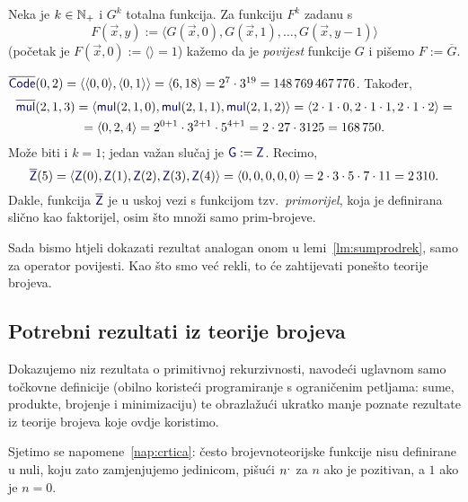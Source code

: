 \begin{definicija}[{name=[povijest totalne brojevne funkcije]}]
Neka je $k\in{\mathbb N}_+$ i $G^k$ totalna funkcija. Za funkciju $F^k$ zadanu s
\begin{equation}\label{eq:povijest}
    F(\vec x,y):=\langle G(\vec x,0),G(\vec x,1),\dotsc,G(\vec x,y-1)\rangle
\end{equation}
(početak je $F(\vec x,0):=\langle\rangle=1$) kažemo da je \emph{povijest} funkcije $G$ i pišemo $F:=\overline G$.
\end{definicija}

\begin{primjer}[{name=[primorijel kao povijest nulfunkcije]}]\label{pr:primorijel}
$\overline{\f{Code}}(0,2)=\kr{\kr{0,0},\kr{0,1}}=\kr{6,18}=2^7\cdot3^{19}=148\,769\,467\,776$. Također,
\begin{multline}
    \overline{\f{mul}}(2,1,3)=\langle\f{mul}(2,1,0),\f{mul}(2,1,1),\f{mul}(2,1,2)\rangle=\langle2\cdot1\cdot0,2\cdot1\cdot1,2\cdot1\cdot2\rangle=\\
    =\langle0,2,4\rangle=2^{0+1}\cdot3^{2+1}\cdot5^{4+1}=2\cdot27\cdot3125=168\,750.
\end{multline}
Može biti i $k=1$; jedan važan slučaj je $\f G:=\f Z$. Recimo,
\begin{equation}
    \overline{\f Z}(5)=\langle\f Z(0),\f Z(1),\f Z(2),\f Z(3),\f Z(4)\rangle=\langle0,0,0,0,0\rangle=2\cdot3\cdot5\cdot7\cdot11=2\,310.
\end{equation}
Dakle, funkcija $\overline{\f Z}$ je u uskoj vezi s funkcijom tzv.\ \emph{primorijel}, koja je definirana slično kao faktorijel, osim što množi samo prim-brojeve.
\end{primjer}

Sada bismo htjeli dokazati rezultat analogan onom u lemi~\ref{lm:sumprodrek}, samo za operator povijesti. Kao što smo već rekli, to će zahtijevati ponešto teorije brojeva.

\subsection{Potrebni rezultati iz teorije brojeva}\label{sec:teobroj}

Dokazujemo niz rezultata o primitivnoj rekurzivnosti, navodeći uglavnom samo toč\-kov\-ne definicije (obilno koristeći programiranje s ograničenim petljama: sume, produkte, brojenje i minimizaciju) te obrazlažući ukratko manje poznate rezultate iz teorije brojeva koje ovdje koristimo.

Sjetimo se napomene~\ref{nap:crtica}: često brojevnoteorijske funkcije nisu definirane u nuli, koju zato zamjenjujemo jedinicom, pišući $n\sp{\text{\normalsize.}}$ za $n$ ako je pozitivan, a $1$ ako je $n=0$.

